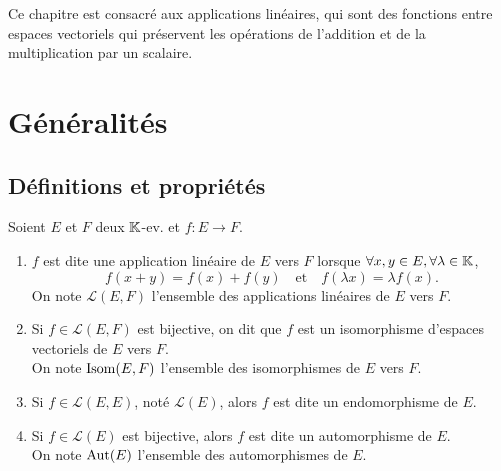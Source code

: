 \documentclass[12pt, a4paper]{report}
\begin{document}

\tableofcontents
\clearpage

\vspace*{\fill}
Ce chapitre est consacré aux applications linéaires, qui sont des fonctions entre espaces vectoriels qui préservent les opérations de l'addition et de la multiplication par un scalaire.
\vspace*{\fill}

\chapter{Généralités}

\section{Définitions et propriétés}

\begin{definition}
    Soient $E$ et $F$ deux $\mathbb{K}$-ev. et $f : E \to F$.
    \begin{enumerate}
        \item $f$ est dite une application linéaire de $E$ vers $F$ lorsque $\forall x, y \in E, \forall \lambda \in \mathbb{K}$,
        \[f(x + y) = f(x) + f(y) \quad \text{et} \quad f(\lambda x) = \lambda f(x).\]
        On note $\mathcal{L}(E, F)$ l'ensemble des applications linéaires de $E$ vers $F$.
        \item Si $f \in \mathcal L(E, F)$ est bijective, on dit que $f$ est un isomorphisme d'espaces vectoriels de $E$ vers $F$.\\On note $\mathrm{Isom}(E, F)$ l'ensemble des isomorphismes de $E$ vers $F$.
        \item Si $f \in \mathcal L(E,E)$, noté $\mathcal L(E)$, alors $f$ est dite un endomorphisme de $E$.
        \item Si $f\in\mathcal L(E)$ est bijective, alors $f$ est dite un automorphisme de $E$.\\On note $\mathrm{Aut}(E)$ l'ensemble des automorphismes de $E$.
    \end{enumerate}
\end{definition}
\end{document}
